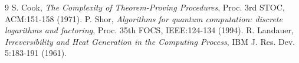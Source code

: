 \documentclass[12pt,a4paper]{article}
\theoremstyle{definition}
\theoremstyle{remark}
\begin{document}
\begin{thebibliography}{9}
 S. Cook, \emph{The Complexity of Theorem-Proving Procedures}, 
Proc. 3rd STOC, ACM:151-158 (1971).
 P. Shor, \emph{Algorithms for quantum computation: discrete logarithms and factoring}, 
Proc. 35th FOCS, IEEE:124-134 (1994).
 R. Landauer, \emph{Irreversibility and Heat Generation in the Computing Process}, 
IBM J. Res. Dev. 5:183-191 (1961).
\end{thebibliography}
\end{document}
